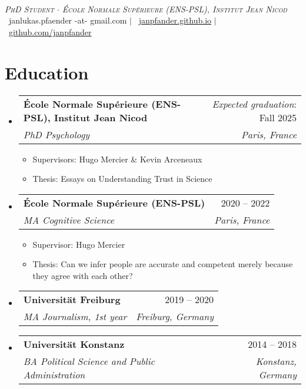 \documentclass[letterpaper,11pt]{article}
\makeatletter
\newcommand{\resumeItem}[1]{
  \item\small{
    {#1 \vspace{-2pt}}
  }
}
\newcommand{\resumeSubheading}[4]{
  \vspace{1pt}\item
    \begin{tabular*}{0.97\textwidth}[t]{l@{\extracolsep{\fill}}r}
      \textbf{#1} & #2 \\
      \textit{\small#3} & \textit{\small #4} \\
    \end{tabular*}\vspace{-7pt}
}
\newcommand{\resumeSubHeadingListStart}{\begin{itemize}[leftmargin=0.15in, label={}]}
\newcommand{\resumeSubHeadingListEnd}{\end{itemize}}
\newcommand{\resumeItemListStart}{\begin{itemize}}
\newcommand{\resumeItemListEnd}{\end{itemize}\vspace{-5pt}}
\makeatother
\begin{document}

\begin{center}
     \\ \vspace{1pt}
    \textit{\scshape PhD Student $\cdot$ École Normale Supérieure (ENS-PSL), Institut Jean Nicod} \\ \vspace{1pt}
    \small 
    \faEnvelope\ janlukas.pfaender -at- gmail.com $|$ 
    \faHome\ \href{https://janpfander.github.io}{janpfander.github.io} $|$
    \faGithub\ \href{https://github.com/janpfander}{github.com/janpfander}
\end{center}



\section{Education}
  \resumeSubHeadingListStart
    \resumeSubheading
      {École Normale Supérieure (ENS-PSL), Institut Jean Nicod}{\textit{Expected graduation}: Fall 2025}
      {PhD Psychology}{Paris, France}
            \resumeItemListStart
        \resumeItem{Supervisors: Hugo Mercier \& Kevin Arceneaux}
        \resumeItem{Thesis: Essays on Understanding Trust in Science}
      \resumeItemListEnd
    \resumeSubheading
      {École Normale Supérieure (ENS-PSL)}{2020 -- 2022}
      {MA Cognitive Science}{Paris, France}
            \resumeItemListStart
        \resumeItem{Supervisor: Hugo Mercier}            
        \resumeItem{Thesis: Can we infer people are accurate and competent merely because they agree with each other?}
      \resumeItemListEnd
    \resumeSubheading
      {Universität Freiburg}{2019 -- 2020}
      {MA Journalism, 1st year}{Freiburg, Germany} 
    \resumeSubheading
      {Universität Konstanz}{2014 -- 2018}
      {BA Political Science and Public Administration}{Konstanz, Germany}
  \resumeSubHeadingListEnd
\end{document}
